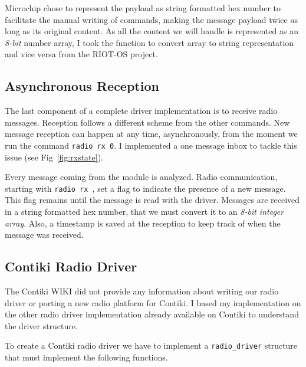 

Microchip chose to represent the payload as string formatted hex number to
facilitate the manual writing of commands, making the message payload twice as
long as its original content. 
As all the content we will handle is represented as an \emph{8-bit} number array, 
I took the function to convert array to string representation and vice versa
from the RIOT-OS project.  %

\subsection{Asynchronous Reception}

The last component of a complete driver implementation is to receive radio
messages.
Reception follows a different scheme from the other commands. 
New message reception can happen at any time, asynchronously, from the moment
we run the command \lstinline{radio rx 0}.
I implemented a one message inbox to tackle this issue (see Fig~\ref{fig:rxstate}).

Every message coming from the module is analyzed.
Radio communication, starting with \lstinline{radio rx }, set a flag to indicate the 
presence of a new message. 
This flag remains until the message is read with the driver.
Messages are received in a string formatted hex number, that we must convert it to an
\emph{8-bit integer array}. 
Also, a timestamp is saved at the reception to keep track of when the
message was received.



\subsection{Contiki Radio Driver}

The Contiki WIKI did not provide any information about writing our radio driver
or porting a new radio platform for Contiki.
I based my implementation on the other radio driver implementation already
available on Contiki to understand the driver structure.

To create a Contiki radio driver we have to implement a \lstinline{radio_driver}
structure that must implement the following functions.

